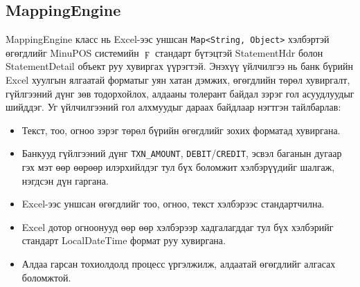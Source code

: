 \subsection{MappingEngine}

MappingEngine класс нь Excel-ээс уншсан  \verb|Map<String, Object>| хэлбэртэй өгөгдлийг MinuPOS системийн $\digamma$ стандарт бүтэцтэй StatementHdr болон StatementDetail объект руу хувиргах үүрэгтэй. Энэхүү үйлчилгээ нь банк бүрийн Excel хуулгын ялгаатай форматыг уян хатан дэмжих, өгөгдлийн төрөл хувиргалт, гүйлгээний дүнг зөв тодорхойлох, алдааны толерант байдал зэрэг гол асуудлуудыг шийддэг. Уг үйлчилгээний гол алхмуудыг дараах байдлаар нэгтгэн тайлбарлав:
\begin{itemize}
	\item Текст, тоо, огноо зэрэг төрөл бүрийн өгөгдлийг зохих форматад хувиргана.
	\item Банкууд гүйлгээний дүнг \verb|TXN_AMOUNT|, \verb|DEBIT|/\verb|CREDIT|, эсвэл баганын дугаар гэх мэт өөр өөрөөр илэрхийлдэг тул бүх боломжит хэлбэрүүдийг шалгаж, нэгдсэн дүн гаргана.
	\item Excel-ээс уншсан өгөгдлийг тоо, огноо, текст хэлбэрээс стандартчилна.
	\item Excel дотор огноонууд өөр өөр хэлбэрээр хадгалагддаг тул бүх хэлбэрийг стандарт LocalDateTime формат руу хувиргана.
	\item Алдаа гарсан тохиолдолд процесс үргэлжилж, алдаатай өгөгдлийг алгасах боломжтой.
\end{itemize}

